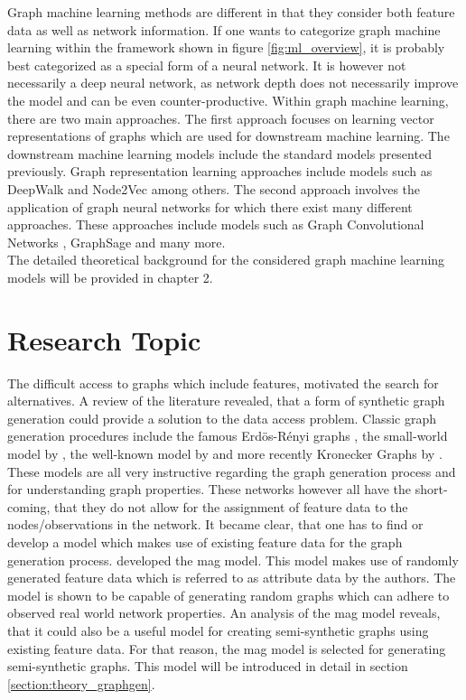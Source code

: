 	\noindent Graph machine learning methods are different in that they consider 
	both feature data as well as network information. If one wants to categorize 
	graph machine learning within the framework shown in figure 
	\ref{fig:ml_overview}, it is probably best categorized as a special form of 
	a neural network. It is however not necessarily a deep neural network, as 
	network depth does not necessarily improve the model and can be even 
	counter-productive. Within graph machine learning, there are two main
	approaches. The first approach focuses on learning vector representations
	of graphs which are used for downstream machine learning. The downstream
	machine learning models include the standard models presented previously. 
	Graph representation learning approaches include models such as DeepWalk 
	\citep{perozzi2014deepwalk} and Node2Vec \citep{grover2016node2vec} among 
	others. The second approach involves the application of graph neural 
	networks for which there exist many different approaches. These approaches 
	include models such as Graph Convolutional Networks \citep{kipf2016semi}, 
	GraphSage \citep{hamilton2017inductive} and many more. \\

	\noindent The detailed theoretical background for the considered graph
	machine learning models will be provided in chapter 2.

	\section{Research Topic}
	\label{section:research_topics}

	\noindent The difficult access to graphs which include features, motivated 
	the search for alternatives. A review of the literature revealed, that a 
	form of synthetic graph generation could provide a solution to the data 
	access problem. Classic graph generation procedures include the famous 
	Erdös-Rényi graphs \citeyearpar{erdos1959random}, the small-world model by 
	\cite{watts1998collective}, the well-known model by 
	\cite{barabasi1999emergence} and more recently Kronecker Graphs by
	\cite{leskovec2010kronecker}. These models are all very instructive
	regarding the graph generation process and for understanding graph
	properties. These networks however all have the short-coming, that they do 
	not allow for the assignment of feature data to the nodes/observations in the
	network. It became clear, that one has to find or develop a model which 
	makes use of existing feature data for the graph generation process. 
	\cite{kim2012multiplicative} developed the \ac{mag} model. This model makes 
	use of randomly generated feature data which is referred to as attribute data 
	by the authors. The model is shown to be capable of generating random graphs 
	which can adhere to observed real world network properties. An analysis of 
	the \ac{mag} model reveals, that it could also be a useful model for 
	creating semi-synthetic graphs using existing feature data. For that reason, 
	the \ac{mag} model is selected for generating semi-synthetic graphs. This 
	model will be introduced in detail in section \ref{section:theory_graphgen}. \\

